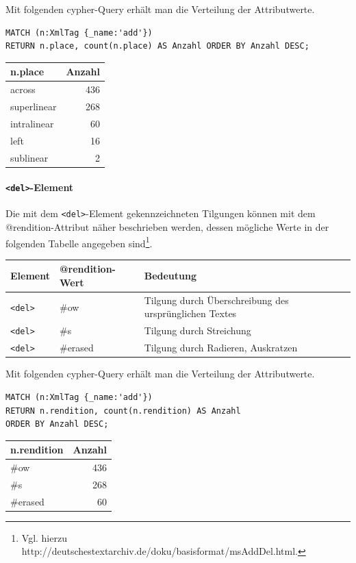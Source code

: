 \documentclass[12pt,ngerman,]{article}
\let\oldparagraph\paragraph
\renewcommand{\paragraph}[1]{\oldparagraph{#1}\mbox{}}
\begin{document}
Mit folgenden cypher-Query erhält man die Verteilung der Attributwerte.

\begin{verbatim}
MATCH (n:XmlTag {_name:'add'})
RETURN n.place, count(n.place) AS Anzahl ORDER BY Anzahl DESC;
\end{verbatim}

\begin{longtable}[]{@{}lr@{}}
\toprule
n.place & Anzahl\tabularnewline
\midrule
\endhead
across & 436\tabularnewline
superlinear & 268\tabularnewline
intralinear & 60\tabularnewline
left & 16\tabularnewline
sublinear & 2\tabularnewline
\bottomrule
\end{longtable}

\paragraph{\texorpdfstring{\texttt{\textless{}del\textgreater{}}-Element}{\textless{}del\textgreater{}-Element}}\label{del-element}

Die mit dem \texttt{\textless{}del\textgreater{}}-Element
gekennzeichneten Tilgungen können mit dem @rendition-Attribut näher
beschrieben werden, dessen mögliche Werte in der folgenden Tabelle
angegeben sind\footnote{Vgl. hierzu
  http://deutschestextarchiv.de/doku/basisformat/msAddDel.html.}.

\begin{longtable}[]{@{}lll@{}}
\toprule
Element & @rendition-Wert & Bedeutung\tabularnewline
\midrule
\endhead
\texttt{\textless{}del\textgreater{}} & \#ow & Tilgung durch
Überschreibung des ursprünglichen Textes\tabularnewline
\texttt{\textless{}del\textgreater{}} & \#s & Tilgung durch
Streichung\tabularnewline
\texttt{\textless{}del\textgreater{}} & \#erased & Tilgung durch
Radieren, Auskratzen\tabularnewline
\bottomrule
\end{longtable}

Mit folgenden cypher-Query erhält man die Verteilung der Attributwerte.

\begin{verbatim}
MATCH (n:XmlTag {_name:'add'})
RETURN n.rendition, count(n.rendition) AS Anzahl
ORDER BY Anzahl DESC;
\end{verbatim}

\begin{longtable}[]{@{}lr@{}}
\toprule
n.rendition & Anzahl\tabularnewline
\midrule
\endhead
\#ow & 436\tabularnewline
\#s & 268\tabularnewline
\#erased & 60\tabularnewline
\bottomrule
\end{longtable}
\end{document}
